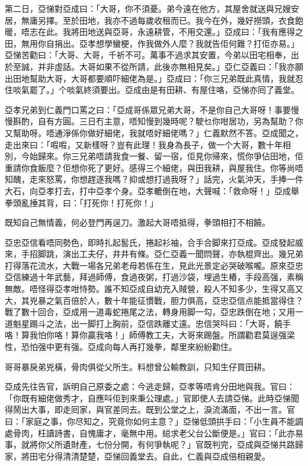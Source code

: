\documentclass[a5paper, 12pt, openany]{book} %
\begin{document}
	第二日，亞悌對亞成曰：「大哥，你不須憂。弟今遠在他方，其屋舍就送與兄嫂安居，無庸另擇。至於田地，我亦不過每歲收租而已。我今在外，幾好撈頭，衣食飽暖，唔志在此。我將田地送與亞哥，永遠耕管，不用交還。」亞成曰：「我有應得之田，無用你自捐出。亞孝想學蠻梗，作我做外人麼？我就告佢何難？打佢亦易。」亞悌苦勸曰：「大哥、大哥，千祈不可。萬事不過求其安置，今弟以田宅相奉，出於至誠，并非虛話。大哥如果不從所請，此後亦無相見矣。」亞仁亞義曰：「我亦願出田地幫助大哥，大哥都要順吓細佬為是。」亞成曰：「你三兄弟既此真情，我就忍住啖氣罷了。」个啖氣終須要出。亞成由是有田耕、有屋住咯，亞悌亦囘了義堂。

	亞孝兄弟到仁義門口罵之曰：「亞成哥係眾兄弟大哥，不是你自己大哥呀！事要慢慢斟酌，自有方圓。三日冇主意，唔知慢到幾時呢？駛乜你咁居功，另為幫助？你又幫助呀。唔通淨係你做好細佬，我就唔好細佬嗎？」仁義默然不答。亞成聞之，走出來曰：「㗇㗇，又新樣呀？豈有此理！我身為長子，做一个大哥，數十年相別，今始歸來。你三兄弟唔請我食一餐、留一宿，佢見你帰來，慌你爭佔田地，佢重請你食飯麼？佢想你死了更好。感得三个細佬，與田我耕，與屋我住。你等尚唔知醜，走來怒罵，你想趕逐我嗎？抑或想打過我呀？」話完，火氣沖天，手捧一件大石，向亞孝打去，打中亞孝个身。亞孝轆倒在地，大聲喊：「救命呀！」亞成舉拳頭亂捶其背，曰：「打死你！打死你！」

	既知自己無情義，何必登門再逞刀。激起大哥唔抵得，拳頭相打不相饒。

	亞忠亞信看唔同勢色，即時扎起䯻氏，捲起衫袖，合手合脚來打亞成。亞成發起威來，手招脚跳，演出工夫仔，井井有條。亞仁亞義一聞𨳒聲，亦執棍齊出。幾兄弟打得落花流水，大戰一場各兄弟老母若係在生，見此光景定必哭破喉嚨。原來亞忠亞信練過十年武藝，拜過師傅，食過夜粥，打過沙袋，埋過生樁，手段高强，素稱無敵。唔怪得亞孝咁恃勢。誰不知亞成自幼充入賊營，殺人不知多少，生得又高又大，其兇暴之氣百倍於人，數十年能征慣戰，胆力俱高，亞忠亞信点能抵當得住？戰了數十回合，亞成用一道毒蛇捲尾之法，轉身用脚一勾，亞忠跌倒在地；又用一道魁星踢斗之法，出一脚打上胸前，亞信跌離丈遠。忠信哭呌曰：「大哥，饒手咯！算我怕你咯！算你贏我咯！」師傅教工夫，大哥來踢盤。所謂勸君莫逞强梁性，恐怕强中更有强。亞成向每人再打幾拳，鄰里來紛紛勸住。

	哥哥暴戾弟兇橫，骨肉俱從父所生。料想曾公輸教訓，只知生仔買田耕。

	亞成先往告官，訴明自己原委之處：今逃走歸，亞孝等唔肯分田地與我。官曰：「你既有細佬做秀才，自應呌佢到來秉公理處。」官即使人去請亞悌。此時亞悌聞得鬧出大事，即走囘家，與官差同去。既到公堂之上，淚流滿面，不出一言。官曰：「家庭之事，你尽知之，究竟你如何主意？」亞悌低頭拱手曰：「小生員不能調處骨肉，枉讀詩書，自愧庸才，毫無中用。縂求老父台公斷便是。」官曰：「此亦易事，就將你父所遺財產，七份分開，有何爭執呢？」官既判完，亞成與亞悌共路歸家，將田宅分得清清楚楚，亞悌回義堂去。自此，仁義與亞成倍相親愛。
\end{document}
